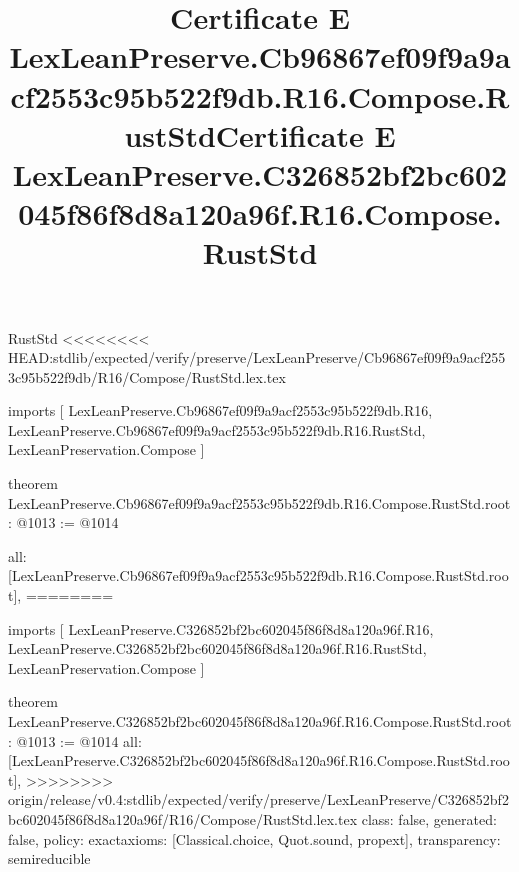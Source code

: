 \begin{lexlean}{RustStd}
<<<<<<<< HEAD:stdlib/expected/verify/preserve/LexLeanPreserve/Cb96867ef09f9a9acf2553c95b522f9db/R16/Compose/RustStd.lex.tex
\title{Certificate E LexLeanPreserve.Cb96867ef09f9a9acf2553c95b522f9db.R16.Compose.RustStd}
\begin{coremodule}
imports [
  LexLeanPreserve.Cb96867ef09f9a9acf2553c95b522f9db.R16,
  LexLeanPreserve.Cb96867ef09f9a9acf2553c95b522f9db.R16.RustStd,
  LexLeanPreservation.Compose
]

theorem LexLeanPreserve.Cb96867ef09f9a9acf2553c95b522f9db.R16.Compose.RustStd.root : @1013 := @1014 {
  all: [LexLeanPreserve.Cb96867ef09f9a9acf2553c95b522f9db.R16.Compose.RustStd.root],
========
\title{Certificate E LexLeanPreserve.C326852bf2bc602045f86f8d8a120a96f.R16.Compose.RustStd}
\begin{coremodule}
imports [
  LexLeanPreserve.C326852bf2bc602045f86f8d8a120a96f.R16,
  LexLeanPreserve.C326852bf2bc602045f86f8d8a120a96f.R16.RustStd,
  LexLeanPreservation.Compose
]

theorem LexLeanPreserve.C326852bf2bc602045f86f8d8a120a96f.R16.Compose.RustStd.root : @1013 := @1014 {
  all: [LexLeanPreserve.C326852bf2bc602045f86f8d8a120a96f.R16.Compose.RustStd.root],
>>>>>>>> origin/release/v0.4:stdlib/expected/verify/preserve/LexLeanPreserve/C326852bf2bc602045f86f8d8a120a96f/R16/Compose/RustStd.lex.tex
  class: false,
  generated: false,
  policy: exact{axioms: [Classical.choice, Quot.sound, propext]},
  transparency: semireducible
}


\end{coremodule}}
\end{coremodule}
\end{lexlean}
